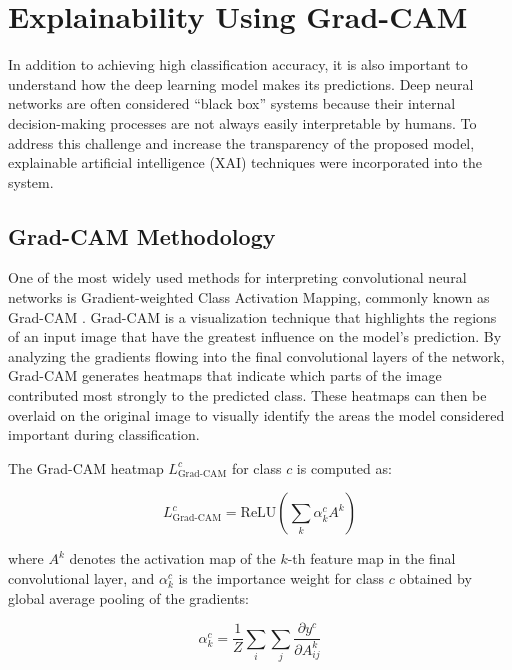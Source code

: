 \documentclass[conference]{IEEEtran}
\begin{document}
\section{Explainability Using Grad-CAM}

In addition to achieving high classification accuracy, it is also important
to understand how the deep learning model makes its predictions. Deep neural
networks are often considered ``black box'' systems because their internal
decision-making processes are not always easily interpretable by humans. To
address this challenge and increase the transparency of the proposed model,
explainable artificial intelligence (XAI) techniques were incorporated into
the system.

\subsection{Grad-CAM Methodology}

One of the most widely used methods for interpreting convolutional neural
networks is Gradient-weighted Class Activation Mapping, commonly known as
Grad-CAM \cite{selvaraju2020gradcam}. Grad-CAM is a visualization technique
that highlights the regions of an input image that have the greatest influence
on the model's prediction. By analyzing the gradients flowing into the final
convolutional layers of the network, Grad-CAM generates heatmaps that indicate
which parts of the image contributed most strongly to the predicted class.
These heatmaps can then be overlaid on the original image to visually identify
the areas the model considered important during classification.

The Grad-CAM heatmap $L^c_{\text{Grad-CAM}}$ for class $c$ is computed as:

\begin{equation}
  L^c_{\text{Grad-CAM}} = \text{ReLU}\!\left(\sum_k \alpha^c_k A^k\right)
\end{equation}

where $A^k$ denotes the activation map of the $k$-th feature map in the final
convolutional layer, and $\alpha^c_k$ is the importance weight for class $c$
obtained by global average pooling of the gradients:

\begin{equation}
  \alpha^c_k = \frac{1}{Z}\sum_i\sum_j \frac{\partial y^c}{\partial A^k_{ij}}
\end{equation}
\end{document}

